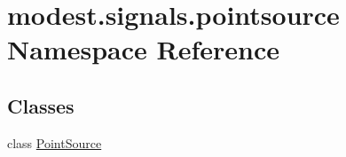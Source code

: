 \hypertarget{namespacemodest_1_1signals_1_1pointsource}{}\section{modest.\+signals.\+pointsource Namespace Reference}
\label{namespacemodest_1_1signals_1_1pointsource}
\subsection*{Classes}
\begin{DoxyCompactItemize}
\item 
class \hyperlink{classmodest_1_1signals_1_1pointsource_1_1PointSource}{Point\+Source}
\end{DoxyCompactItemize}
